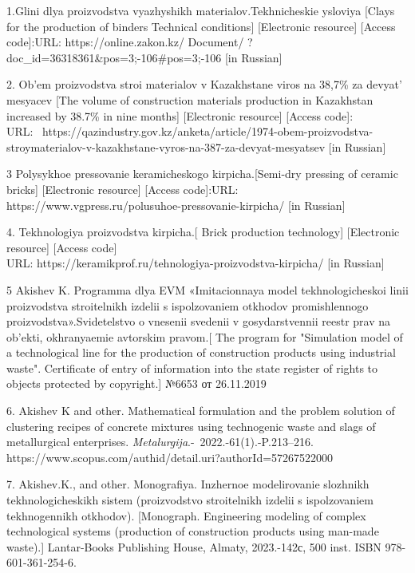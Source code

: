 \begin{noparindent}

1.Glini dlya proizvodstva vyazhyshikh materialov.Tekhnicheskie ysloviya
{[}Clays for the production of binders Technical conditions{]}
{[}Electronic resource{]} {[}Access code{]}:URL:
https://online.zakon.kz/ Document/
?doc\_id=36318361\&pos=3;-106\#pos=3;-106 {[}in Russian{]}

2. Ob'em proizvodstva stroi materialov v Kazakhstane viros na 38,7\% za
devyat' mesyacev {[}The volume of construction materials production in
Kazakhstan increased by 38.7\% in nine months{]} {[}Electronic
resource{]} {[}Access code{]}: \\URL:~
https://qazindustry.gov.kz/anketa/article/1974-obem-proizvodstva-stroymaterialov-v-kazakhstane-vyros-na-387-za-devyat-mesyatsev
{[}in Russian{]}

3 Polysykhoe pressovanie keramicheskogo kirpicha.{[}Semi-dry pressing of
ceramic bricks{]} {[}Electronic resource{]} {[}Access code{]}:URL:
https://www.vgpress.ru/polusuhoe-pressovanie-kirpicha/ {[}in Russian{]}

4. Tekhnologiya proizvodstva kirpicha.{[} Brick production technology{]}
{[}Electronic resource{]} {[}Access code{]}\\URL:
https://keramikprof.ru/tehnologiya-proizvodstva-kirpicha/ {[}in
Russian{]}

5 Akishev K. Programma dlya EVM «Imitacionnaya model tekhnologicheskoi
linii proizvodstva stroitelnikh izdelii s ispolzovaniem otkhodov
promishlennogo proizvodstva».Svidetelstvo o vnesenii svedenii v
gosydarstvennii reestr prav na ob'ekti, okhranyaemie avtorskim
pravom.{[} The program for "Simulation model of a technological line for
the production of construction products using industrial waste".
Certificate of entry of information into the state register of rights to
objects protected by copyright.{]} №6653 от 26.11.2019

6. Akishev K and other. Mathematical formulation and the problem
solution of clustering recipes of concrete mixtures using technogenic
waste and slags of metallurgical enterprises.
\emph{Metalurgija}.-~2022.-61(1).-P.213--216.\\
https://www.scopus.com/authid/detail.uri?authorId=57267522000

7. Akishev.K., and other. Monografiya. Inzhernoe modelirovanie slozhnikh
tekhnologicheskikh sistem (proizvodstvo stroitelnikh izdelii s
ispolzovaniem tekhnogennikh otkhodov). {[}Monograph. Engineering
modeling of complex technological systems (production of construction
products using man-made waste).{]} Lantar-Books Publishing House,
Almaty, 2023.-142с, 500 inst. ISBN 978-601-361-254-6.


\end{noparindent}
